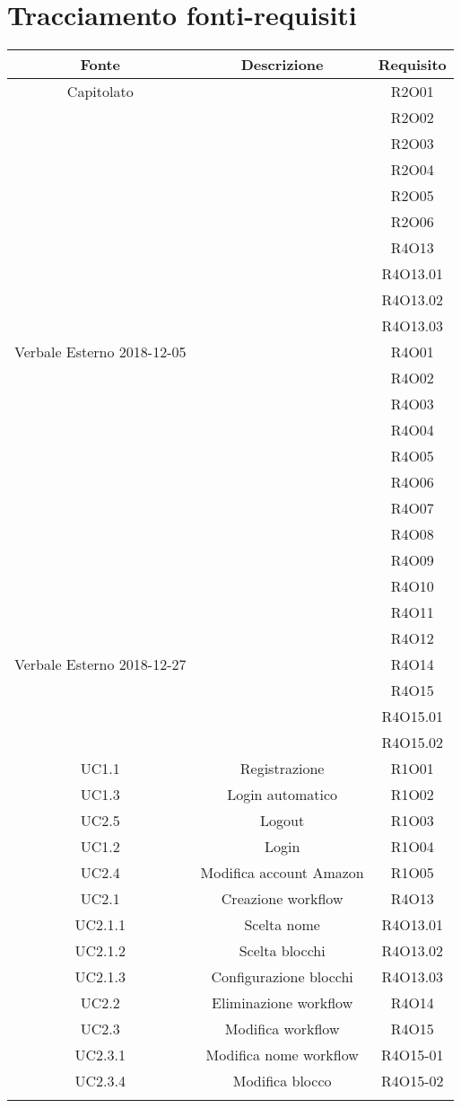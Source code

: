 \section{Tracciamento fonti-requisiti}
\begin{tabularx}{\textwidth}{|C|C|C|}
	\hline
	\textbf{Fonte} &\textbf{Descrizione} & \textbf{Requisito} \\
	\hline
	\endhead
	Capitolato& &R2O01\\&&R2O02\\&&R2O03\\&&R2O04\\&&R2O05\\&&R2O06\\&&R4O13\\&&R4O13.01\\&&R4O13.02\\&&R4O13.03\\
	\hline
	Verbale Esterno 2018-12-05&&R4O01\\&&R4O02\\&&R4O03\\&&R4O04\\&&R4O05\\&&R4O06\\&&R4O07\\&&R4O08\\&&R4O09\\&&R4O10\\&&R4O11\\&&R4O12\\
	\hline
	Verbale Esterno 2018-12-27&&R4O14\\&&R4O15\\&&R4O15.01\\&&R4O15.02\\
	\hline
	UC1.1  &Registrazione &R1O01\\
	\hline
	UC1.3  &Login automatico&R1O02\\
	\hline
	UC2.5   &Logout&R1O03\\
	\hline
	UC1.2 &Login&R1O04\\
	\hline
	UC2.4 &Modifica account Amazon&R1O05\\
	\hline
	UC2.1 &Creazione workflow&R4O13\\
	\hline
	UC2.1.1 &Scelta nome&R4O13.01\\
	\hline
	UC2.1.2 &Scelta blocchi&R4O13.02\\
	\hline
	UC2.1.3 &Configurazione blocchi&R4O13.03\\
	\hline
	UC2.2 &Eliminazione workflow&R4O14\\
	\hline
	UC2.3 &Modifica workflow&R4O15\\
	\hline	
	UC2.3.1 &Modifica nome workflow&R4O15-01\\
	\hline
	UC2.3.4 &Modifica blocco&R4O15-02\\
	\hline
	\caption{Tabella fonti-requisiti}
\end{tabularx}

